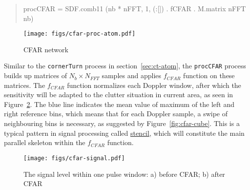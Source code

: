 \documentclass[
  a4paper,
]{article}
\newenvironment{Shaded}{}{}
\newcommand{\DecValTok}[1]{\textcolor[rgb]{0.25,0.63,0.44}{#1}}
\newcommand{\FunctionTok}[1]{\textcolor[rgb]{0.02,0.16,0.49}{#1}}
\newcommand{\NormalTok}[1]{#1}
\begin{document}
\begin{quote}
\begin{Shaded}
\begin{Highlighting}[numbers=left,,firstnumber=394,]
\NormalTok{procCFAR }\FunctionTok{=}\NormalTok{ SDF.comb11 (nb }\FunctionTok{*}\NormalTok{ nFFT, }\DecValTok{1}\NormalTok{, (}\FunctionTok{:}\NormalTok{[]) }\FunctionTok{.}\NormalTok{ fCFAR }\FunctionTok{.}\NormalTok{ M.matrix nFFT nb)}
\end{Highlighting}
\end{Shaded}
\end{quote}

\begin{figure}
\hypertarget{fig:cfar-net-atom}{%
\centering
\texttt{[image: figs/cfar-proc-atom.pdf]}
\caption{CFAR network}\label{fig:cfar-net-atom}
}
\end{figure}

Similar to the \texttt{cornerTurn} process in section~\ref{sec:ct-atom},
the \texttt{procCFAR} process builds up matrices of
\(N_b\times N_{FFT}\) samples and applies \(f_{CFAR}\) function on these
matrices. The \(f_{CFAR}\) function normalizes each Doppler window,
after which the sensitivity will be adapted to the clutter situation in
current area, as seen in Figure~\ref{fig:cfar-signal}. The blue line
indicates the mean value of maximum of the left and right reference
bins, which means that for each Doppler sample, a swipe of neighbouring
bins is necessary, as suggested by Figure~\ref{fig:cfar-cube}. This is a
typical pattern in signal processing called
\href{https://en.wikipedia.org/wiki/Stencil_code}{stencil}, which will
constitute the main parallel skeleton within the \(f_{CFAR}\) function.

\begin{figure}
\hypertarget{fig:cfar-signal}{%
\centering
\texttt{[image: figs/cfar-signal.pdf]}
\caption{The signal level within one pulse window: a) before CFAR; b)
after CFAR}\label{fig:cfar-signal}
}
\end{figure}
\end{document}
